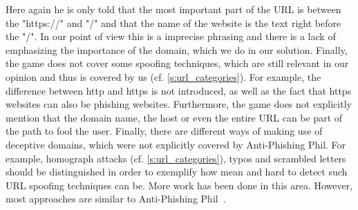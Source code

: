 Here again he is only told that the most important part of the URL is between the "https://" and "/" and that the name of the website is the text right before the "/". 
In our point of view this is a imprecise phrasing and there is a lack of emphasizing the importance of the domain, which we do in our solution. 
Finally, the game does not cover some spoofing techniques, which are still relevant in our opinion and thus is covered by us (cf. \autoref{s:url_categories}). 
For example, the difference between http and https is not introduced, as well as the fact that https websites can also be phishing websites. 
Furthermore, the game does not explicitly mention that the domain name, the host or even the entire URL can be part of the path to fool the user. 
Finally, there are different ways of making use of deceptive domains, which were not explicitly covered by Anti-Phishing Phil. 
For example, homograph attacks (cf. \autoref{s:url_categories}), typos and scrambled letters should be distinguished in order to exemplify how mean and hard to detect such URL spoofing techniques can be. \newline
More work has been done in this area. However, most approaches are similar to Anti-Phishing Phil~\cite{arachchilage2011designing,arachchilage2012designing}.

